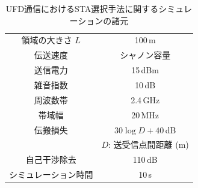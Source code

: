 \documentclass[master]{kuisthesis}		%
\begin{document}
			\begin{table}[htbp]
				\centering
				\caption{UFD通信におけるSTA選択手法に関するシミュレーションの諸元}
				\label{tab:param}
				\begin{tabular}{cc} \hline
					領域の大きさ $L$ & 100\,m \\
					伝送速度 & シャノン容量 \\
					送信電力 & 15\,dBm \\
					雑音指数 & 10\,dB \\
					周波数帯 & 2.4\,GHz \\
					帯域幅 & 20\,MHz \\
					伝搬損失 & $30\log D + 40$\,dB\\
					&$D$: 送受信点間距離 (m)\\
					自己干渉除去 & 110\,dB \\
					シミュレーション時間 & 10\,s \\\hline
				\end{tabular}
			\end{table}
\end{document}
